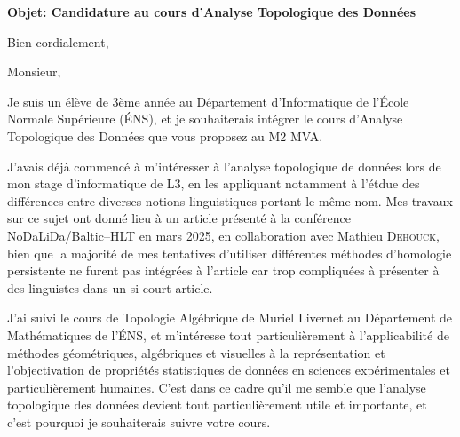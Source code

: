 \documentclass[11pt,a4paper,roman]{moderncv}
\def\nl{\\ \vspace{1em}}
\begin{document}
\date{\today}
\opening{\textbf{Objet: Candidature au cours d'Analyse Topologique des Données}}
\closing{Bien cordialement, \vspace{-2em}}

\makelettertitle

Monsieur,
\nl

Je suis un élève de 3ème année au Département d'Informatique de l'École Normale
Supérieure (ÉNS), et je souhaiterais intégrer le cours d'Analyse Topologique des
Données que vous proposez au M2 MVA.
\nl

J'avais déjà commencé à m'intéresser à l'analyse topologique de données lors de mon
stage d'informatique de L3, en les appliquant notamment à l'étdue des différences
entre diverses notions linguistiques portant le même nom.
Mes travaux sur ce sujet ont donné lieu à un article présenté à la conférence
NoDaLiDa/Baltic--HLT en mars 2025, en collaboration avec Mathieu
\textsc{Dehouck}, bien que la majorité de mes tentatives d'utiliser différentes
méthodes d'homologie persistente ne furent pas intégrées à l'article car trop
compliquées à présenter à des linguistes dans un si court article.
\nl

J'ai suivi le cours de Topologie Algébrique de Muriel Livernet au Département de Mathématiques
de l'ÉNS, et m'intéresse tout particulièrement à l'applicabilité de méthodes géométriques,
algébriques et visuelles à la représentation et l'objectivation de propriétés statistiques
de données en sciences expérimentales et particulièrement humaines.
C'est dans ce cadre qu'il me semble que l'analyse topologique des données devient tout
particulièrement utile et importante, et c'est pourquoi je souhaiterais suivre votre cours.

\vspace{1em}
\makeletterclosing
\end{document}
